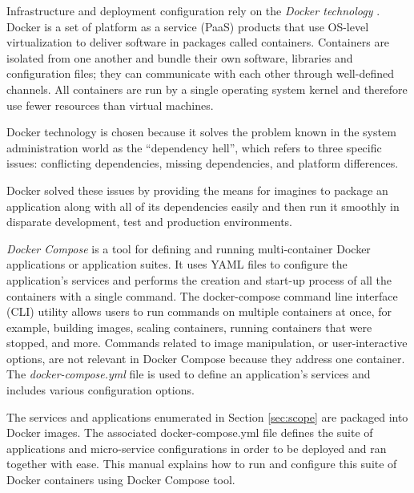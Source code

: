 	Infrastructure and deployment configuration rely on the \textit{Docker technology} \citep{docker-merkel2014docker}. Docker is a set of platform as a service (PaaS) products that use OS-level virtualization to deliver software in packages called containers. Containers are isolated from one another and bundle their own software, libraries and configuration files; they can communicate with each other through well-defined channels. All containers are run by a single operating system kernel and therefore use fewer resources than virtual machines.

	Docker technology is chosen because it solves the problem known in the system administration world as the ``dependency hell'', which refers to three specific issues: conflicting dependencies, missing dependencies, and platform differences.

	Docker solved these issues by providing the means for imagines to package an application along with all of its dependencies easily and then run it smoothly in disparate development, test and production
environments.
		
	\textit{Docker Compose} is a tool for defining and running multi-container Docker applications or application suites. It uses YAML files to configure the application's services and performs the creation and start-up process of all the containers with a single command. The docker-compose command line interface (CLI) utility allows users to run commands on multiple containers at once, for example, building images, scaling containers, running containers that were stopped, and more. Commands related to image manipulation, or user-interactive options, are not relevant in Docker Compose because they address one container. The \textit{docker-compose.yml} file is used to define an application's services and includes various configuration options.

	The services and applications enumerated in Section \ref{sec:scope} are packaged into Docker images. The associated docker-compose.yml file defines the suite of applications and micro-service configurations in order to be deployed and ran together with ease. This manual explains how to run and configure this suite of Docker containers using Docker Compose tool.